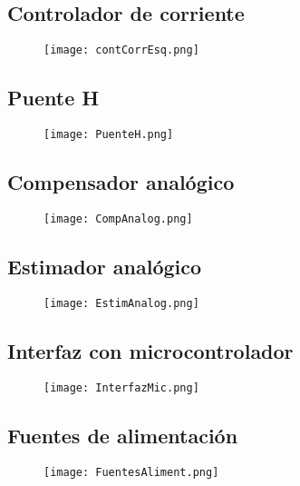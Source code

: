 \subsection{Controlador de corriente}
\begin{figure}[H]
	\centering
	\texttt{[image: contCorrEsq.png]}
	\label{fig:contCorrEsq}
\end{figure}

\subsection{Puente H}
\begin{figure}[H]
	\centering
	\texttt{[image: PuenteH.png]}
	\label{fig:PuenteH}
\end{figure}

\subsection{Compensador analógico}
\begin{figure}[H]
	\centering
	\texttt{[image: CompAnalog.png]}
	\label{fig:CompAnalog}
\end{figure}

\subsection{Estimador analógico}
\begin{figure}[H]
	\centering
	\texttt{[image: EstimAnalog.png]}
	\label{fig:EstimAnalog}
\end{figure}

\subsection{Interfaz con microcontrolador}
\begin{figure}[H]
	\centering
	\texttt{[image: InterfazMic.png]}
	\label{fig:InterfazMic}
\end{figure}

\subsection{Fuentes de alimentación}
\begin{figure}[H]
	\centering
	\texttt{[image: FuentesAliment.png]}
	\label{fig:FuentesAliment}
\end{figure}


